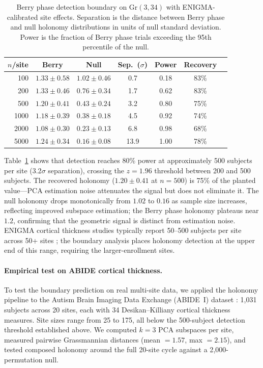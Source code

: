 \documentclass{article}
\newcommand{\Gr}{\mathrm{Gr}}
\begin{document}
\begin{table}[t]
\centering
\caption{Berry phase detection boundary on $\Gr(3, 34)$ with ENIGMA-calibrated site effects. Separation is the distance between Berry phase and null holonomy distributions in units of null standard deviation. Power is the fraction of Berry phase trials exceeding the 95th percentile of the null.}
\label{tab:boundary}
\small
\begin{tabular}{@{}rcccccc@{}}
\toprule
\textbf{$n$/site} & \textbf{Berry} & \textbf{Null} & \textbf{Sep.\ ($\sigma$)} & \textbf{Power} & \textbf{Recovery} \\
\midrule
100  & $1.33 \pm 0.58$ & $1.02 \pm 0.46$ & 0.7 & 0.18 & 83\% \\
200  & $1.33 \pm 0.46$ & $0.76 \pm 0.34$ & 1.7 & 0.62 & 83\% \\
500  & $1.20 \pm 0.41$ & $0.43 \pm 0.24$ & 3.2 & 0.80 & 75\% \\
1000 & $1.18 \pm 0.39$ & $0.38 \pm 0.18$ & 4.5 & 0.92 & 74\% \\
2000 & $1.08 \pm 0.30$ & $0.23 \pm 0.13$ & 6.8 & 0.98 & 68\% \\
5000 & $1.24 \pm 0.34$ & $0.16 \pm 0.08$ & 13.9 & 1.00 & 78\% \\
\bottomrule
\end{tabular}
\end{table}

Table~\ref{tab:boundary} shows that detection reaches 80\% power at approximately 500 subjects per site (3.2$\sigma$ separation), crossing the $z = 1.96$ threshold between 200 and 500 subjects.
The recovered holonomy ($1.20 \pm 0.41$ at $n = 500$) is 75\% of the planted value---PCA estimation noise attenuates the signal but does not eliminate it.
The null holonomy drops monotonically from $1.02$ to $0.16$ as sample size increases, reflecting improved subspace estimation; the Berry phase holonomy plateaus near $1.2$, confirming that the geometric signal is distinct from estimation noise.
ENIGMA cortical thickness studies typically report 50--500 subjects per site across 50+ sites \citep{thompson2020enigma}; the boundary analysis places holonomy detection at the upper end of this range, requiring the larger-enrollment sites.

\paragraph{Empirical test on ABIDE cortical thickness.}
To test the boundary prediction on real multi-site data, we applied the holonomy pipeline to the Autism Brain Imaging Data Exchange (ABIDE~I) dataset \citep{di2014autism}: 1{,}031 subjects across 20 sites, each with 34 Desikan--Killiany cortical thickness measures.
Site sizes range from 25 to 175, all below the 500-subject detection threshold established above.
We computed $k = 3$ PCA subspaces per site, measured pairwise Grassmannian distances (mean $= 1.57$, max $= 2.15$), and tested composed holonomy around the full 20-site cycle against a 2{,}000-permutation null.
\end{document}
